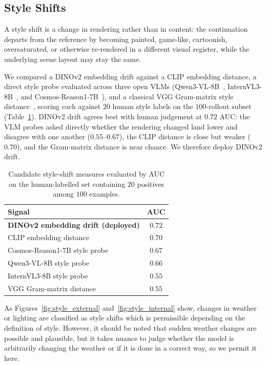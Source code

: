 \subsection{Style Shifts}
\label{app:val_style}

A style shift is a change in rendering rather than in content:
the continuation departs from the reference by becoming painted, game-like,
cartoonish, oversaturated, or otherwise re-rendered in a different visual
register, while the underlying scene layout may stay the same.

We compared a DINOv2 embedding drift against a CLIP embedding distance, a direct
style probe evaluated across three open VLMs (Qwen3-VL-8B~\cite{QWEN},
InternVL3-8B~\cite{internvl3}, and Cosmos-Reason1-7B~\cite{cosmos2}), and a
classical VGG Gram-matrix style distance~\cite{gatys2016image}, scoring each against
$20$ human style labels on the $100$-rollout subset
(Table~\ref{tab:style_metric_auc}). DINOv2 drift agrees best with human judgement
at $0.72$ AUC: the VLM probes asked directly whether the rendering changed land
lower and disagree with one another ($0.55$--$0.67$), the CLIP distance is close
but weaker ($0.70$), and the Gram-matrix distance is near chance. We therefore
deploy DINOv2 drift.

\begin{table}[t]
\centering
{
\small
\begin{tabular}{lc}
\toprule
Signal & AUC \\
\midrule
\textbf{DINOv2 embedding drift (deployed)} & $\mathbf{0.72}$ \\
CLIP embedding distance                    & $0.70$ \\
Cosmos-Reason1-7B style probe              & $0.67$ \\
Qwen3-VL-8B style probe                    & $0.66$ \\
InternVL3-8B style probe                   & $0.55$ \\
VGG Gram-matrix distance                   & $0.55$ \\
\bottomrule
\end{tabular}
}
\caption{
    Candidate style-shift measures evaluated by AUC on the human-labelled set
    containing $20$ positives among $100$ examples.
}
\label{tab:style_metric_auc}
\end{table}

As Figures~\ref{fig:style_external} and~\ref{fig:style_internal}
show, changes in weather or lighting are classified as style shifts which is permissible depending on the definition of style. However, it should be noted that sudden weather changes are possible and plausible, but it takes nuance to judge whether the model is arbitrarily changing the weather or if it is done in a correct way, so we permit it here.

